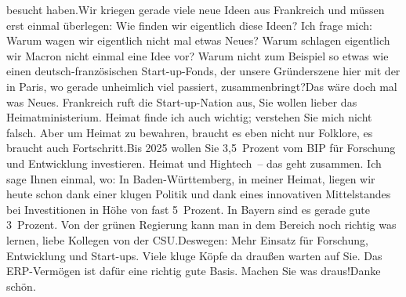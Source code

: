 \documentclass{article}
\begin{document}
besucht haben.Wir kriegen gerade viele neue Ideen aus Frankreich und müssen erst einmal überlegen: Wie finden wir eigentlich diese Ideen? Ich frage mich: Warum wagen wir eigentlich nicht mal etwas Neues? Warum schlagen eigentlich wir Macron nicht einmal eine Idee vor? Warum nicht zum Beispiel so etwas wie einen deutsch-französischen Start-up-Fonds, der unsere Gründerszene hier mit der in Paris, wo gerade unheimlich viel passiert, zusammenbringt?Das wäre doch mal was Neues. Frankreich ruft die Start-up-Nation aus, Sie wollen lieber das Heimatministerium. Heimat finde ich auch wichtig; verstehen Sie mich nicht falsch. Aber um Heimat zu bewahren, braucht es eben nicht nur Folklore, es braucht auch Fortschritt.Bis 2025 wollen Sie 3,5 Prozent vom BIP für Forschung und Entwicklung investieren. Heimat und Hightech – das geht zusammen. Ich sage Ihnen einmal, wo: In Baden-Württemberg, in meiner Heimat, liegen wir heute schon dank einer klugen Politik und dank eines innovativen Mittelstandes bei Investitionen in Höhe von fast 5 Prozent. In Bayern sind es gerade gute 3 Prozent. Von der grünen Regierung kann man in dem Bereich noch richtig was lernen, liebe Kollegen von der CSU.Deswegen: Mehr Einsatz für Forschung, Entwicklung und Start-ups. Viele kluge Köpfe da draußen warten auf Sie. Das ERP-Vermögen ist dafür eine richtig gute Basis. Machen Sie was draus!Danke schön.
\end{document}
